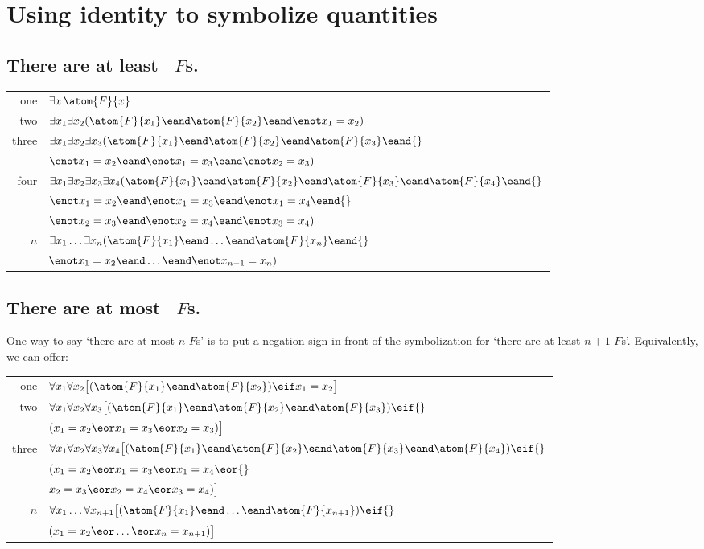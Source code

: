 
\newpage
\section{Using identity to symbolize quantities}

\subsection*{There are at least \blank\ $F$s.}
\label{summary.atleast}

\begin{tabular*}{\textwidth}{rl}
one & $\exists x\,\atom{F}{x}$\\
two & $\exists x_1\exists x_2(\atom{F}{x_1} \eand \atom{F}{x_2} \eand \enot x_1  = x_2)$\\
three & $\exists x_1\exists x_2\exists x_3(\atom{F}{x_1} \eand \atom{F}{x_2} \eand \atom{F}{x_3} \eand {}$\\
& $\enot x_1 = x_2 \eand\enot x_1 = x_3 \eand \enot x_2 = x_3)$\\
four & $\exists x_1\exists x_2\exists x_3\exists x_4 (\atom{F}{x_1} \eand \atom{F}{x_2} \eand \atom{F}{x_3} \eand \atom{F}{x_4} \eand {}$\\
& $\enot x_1 = x_2 \eand \enot x_1 = x_3 \eand \enot x_1 = x_4 \eand {}$\\
& $ \enot x_2 = x_3 \eand \enot x_2 = x_4 \eand \enot x_3 = x_4)$\\
$n$ & $\exists x_1\ldots\exists x_n(\atom{F}{x_1} \eand \ldots \eand \atom{F}{x_n} \eand {}$\\
& $\enot x_1 = x_2 \eand\ldots\eand \enot x_{n-1} = x_n)$ 
\end{tabular*}

\subsection*{There are at most \blank\ $F$s.}
\label{summary.atmost}

One way to say `there are at most $n$ $F$s' is to put a negation sign in front of the symbolization for `there are at least $n+1$ $F$s'. Equivalently, we can offer:
\begin{tabular*}{\textwidth}{rl}
one & $\forall x_1\forall x_2\bigl[(\atom{F}{x_1} \eand \atom{F}{x_2}) \eif x_1=x_2\bigr]$\\
two & $\forall x_1\forall x_2\forall x_3\bigl[(\atom{F}{x_1} \eand \atom{F}{x_2} \eand \atom{F}{x_3}) \eif {}$\\ & $(x_1=x_2 \eor x_1=x_3 \eor x_2=x_3)\bigr]$\\
three & $\forall x_1\forall x_2\forall x_3\forall x_4\bigl[(\atom{F}{x_1} \eand \atom{F}{x_2} \eand \atom{F}{x_3} \eand \atom{F}{x_4}) \eif {}$\\
& $(x_1=x_2 \eor x_1=x_3 \eor x_1=x_4 \eor {}$\\
& $x_2=x_3 \eor x_2=x_4 \eor x_3=x_4)\bigr]$\\
$n$ & $\forall x_1\ldots\forall x_{n+1}
\bigl[(\atom{F}{x_1} \eand \ldots \eand \atom{F}{x_{n+1}}) \eif {}$\\
& $(x_1=x_2 \eor \ldots \eor x_n=x_{n+1})\bigr]$ 
\end{tabular*}



